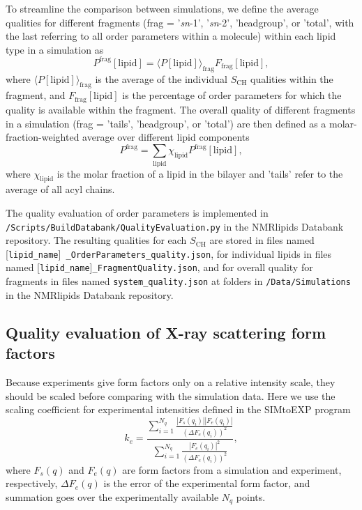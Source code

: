 \documentclass[fleqn,10pt]{wlscirep}
\begin{document}
To streamline the comparison between simulations, we define the average qualities for different fragments (frag = '\textit{sn}-1', '\textit{sn}-2', 'headgroup', or 'total', with the last referring to all order parameters within a molecule) within each lipid type in a simulation as
\begin{equation}
    P^\mathrm{frag}[\mathrm{lipid}] = \langle P[\mathrm{lipid}]\rangle_\mathrm{frag} F_\mathrm{frag}[\mathrm{lipid}],
\end{equation}
where $\langle P[\mathrm{lipid}]\rangle_\mathrm{frag}$ is the average of the individual $S_\mathrm{CH}$ qualities within the fragment, and $F_\mathrm{frag}[\mathrm{lipid}]$ is the percentage of order parameters for which the quality is available within the fragment. The overall quality of different fragments in a simulation (frag = 'tails', 'headgroup', or 'total') are then defined as a molar-fraction-weighted average over different lipid components
\begin{equation}
    P^\mathrm{frag} = \sum_\mathrm{lipid} \chi_\mathrm{lipid} P^\mathrm{frag}[\mathrm{lipid}],
\end{equation}
where $\chi_\mathrm{lipid}$ is the molar fraction of a lipid in the bilayer and 'tails' refer to the average of all acyl chains.

The quality evaluation of order parameters is implemented in \texttt{/Scripts/BuildDatabank/QualityEvaluation.py} in the NMRlipids Databank repository. The resulting qualities for each $S_\mathrm{CH}$ are stored in files named  [\texttt{lipid\_name}]\texttt{ \_OrderParameters\_quality.json}, for individual lipids in files named [\texttt{lipid\_name}]\texttt{\_FragmentQuality.json}, and for overall quality for fragments in files named \texttt{system\_quality.json} at folders in \texttt{/Data/Simulations} in the NMRlipids Databank repository. 


\subsection{Quality evaluation of X-ray scattering form factors}
Because experiments give form factors only on a relative intensity scale, they should be scaled before comparing with the simulation data. Here we use the scaling coefficient for experimental intensities defined in the SIMtoEXP program~\cite{kucerka10}
\begin{equation}
    k_e = \frac{\sum_{i=1}^{N_q} \frac{|F_s(q_i)||F_e(q_i)|}{(\Delta F_e(q_i))^2}}{\sum_{i=1}^{N_q} \frac{|F_e(q_i)|^2}{(\Delta F_e(q_i))^2}},
\end{equation}
where $F_s(q)$ and $F_e(q)$ are form factors from a simulation and experiment, respectively, $\Delta F_e(q)$ is the error of the experimental form factor, and summation goes over the experimentally available $N_q$ points. 
\end{document}
